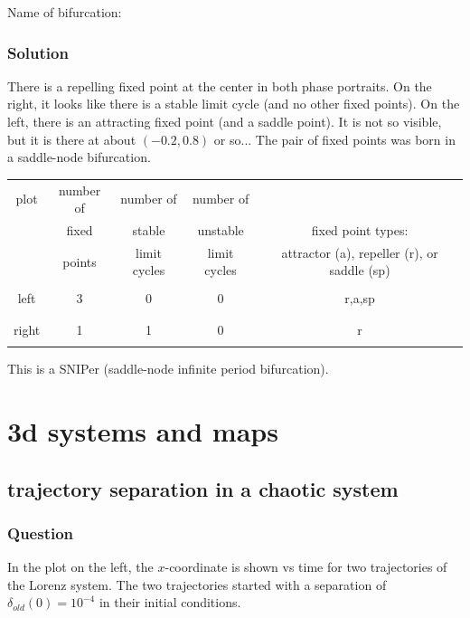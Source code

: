 \documentclass[12pt,letterpaper,noanswers]{exam}
\begin{document}
Name of bifurcation:



\subsubsection{Solution}

There is a repelling fixed point at the center in both phase portraits.  On the right, it looks like there is a stable limit cycle (and no other fixed points).  On the left, there is an attracting fixed point (and a saddle point).  It is not so visible, but it is there at about $(-0.2, 0.8)$ or so...  The pair of fixed points was born in a saddle-node bifurcation.

\begin{tabular}{| c | c | c | c | c |}
\hline
plot & number of & number of  & number of  & \hspace{3in} \\
& fixed & stable & unstable &fixed point types:   \\
&  points  & limit cycles & limit cycles & attractor (a), repeller (r), or saddle (sp) \\
\hline
& & & &\\
left & 3 & 0 & 0  & r,a,sp \\
& & & &\\
\hline
& & & &\\
right& 1 & 1 & 0 & r \\
& & & &\\
\hline
\end{tabular}

This is a SNIPer (saddle-node infinite period bifurcation).


\section{3d systems and maps}
\subsection{trajectory separation in a chaotic system}
\subsubsection{Question}
In the plot on the left, the $x$-coordinate is shown vs time for two trajectories of the Lorenz system.  The two trajectories started with a separation of $\delta_{old}(0) = 10^{-4}$ in their initial conditions.
\end{document}
